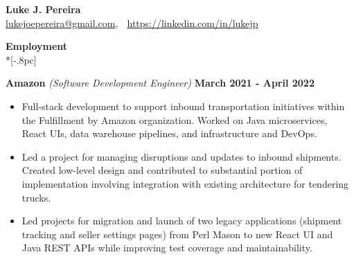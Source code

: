 \documentclass{article}
\begin{document}
\begin{center}
{\Large \bf Luke J. Pereira} \\[.5pc]
\href{mailto:lukejoepereira@gmail.com}{lukejoepereira@gmail.com}, $\;$
\href{https://linkedin.com/in/lukejp}{https://linkedin.com/in/lukejp}
\\[3pc]
\end{center}
\vspace{-25pt}

{\large \bf Employment} \\*[-.8pc]
\underline{\hspace{7in}}

{\bf Amazon } \textit{(Software Development Engineer)} \hfill {\bf March 2021 - April 2022\/} 
\begin{itemize}[leftmargin=*]
    \itemsep0em
    \renewcommand\labelitemi{\tiny$\bullet$}
    \item Full-stack development to support inbound transportation initiatives within the Fulfillment by Amazon organization. Worked on Java microservices, React UIs, data warehouse pipelines, and infrastructure and DevOps.
    \item Led a project for managing disruptions and updates to inbound shipments. Created low-level design and contributed to substantial portion of implementation involving integration with existing architecture for tendering trucks.
    \item Led projects for migration and launch of two legacy applications (shipment tracking and seller settings pages) from Perl Mason to new React UI and Java REST APIs while improving test coverage and maintainability.
\end{itemize}
\end{document}
